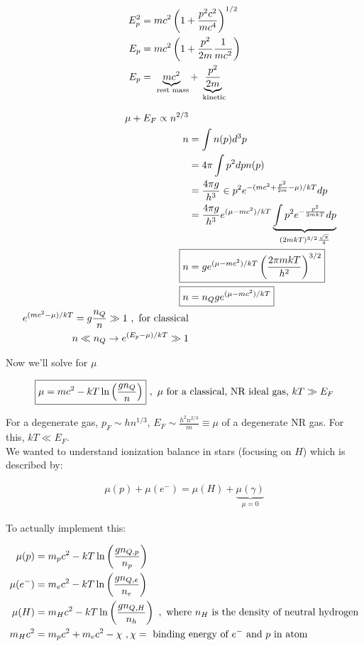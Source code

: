 \begin{align}
E_p^2 &= mc^2\left( 1 + \frac{p^2c^2}{mc^4} \right)^{1/2}\\
E_p &= mc^2 \left( 1 + \frac{p^2}{2m} \frac{1}{mc^2} \right)\\
E_p &= \underbrace{mc^2}_{\text{ rest mass}} + \underbrace{\frac{p^2}{2m}}_{\text{ kinetic}}
\end{align}

\begin{align}
\mu + E_F \pt n^{2/3}\\
n &= \int n(p) d^3p\\
&= 4 \pi \int p^2 dp n(p)\\
&= \frac{4 \pi g}{h^3}  \in p^2 e^{-(mc^2 + \frac{p^2}{2m} - \mu)/kT} dp\\
&= \frac{4 \pi g}{h^3} e^{(\mu -mc^2)/kT} \underbrace{\int  p^2 e^{-\frac{p^2}{2mkT}} dp}_{(2mkT)^{3/2} \frac{\sqrt{\pi}}{4}}\\
\Aboxed{n &= g e^{(\mu - mc^2)/kT} \lp \frac{2 \pi mkT}{h^2} \rp^{3/2}}\\
\Aboxed{n &= n_Q g e^{(\mu - mc^2)/kT}}\\
e^{(mc^2 - \mu)/kT} = g\frac{n_Q}{n} \gg 1 ~, \text{ for classical}\\
n \ll n_Q \ra e^{(E_p - \mu)/kT} \gg 1
\end{align}

Now we'll solve for $\mu$

\begin{align}
\boxed{\mu = mc^2 - kT \ln \left( \frac{gn_Q}{n} \right)} ~,\text{ $\mu$ for a classical, NR ideal gas, }kT \gg E_F
\end{align}

For a degenerate gas, $p_F \sim hn^{1/3}$, $E_F \sim \frac{h^2 n^{2/3}}{m} \equiv \mu$ of a degenerate NR gas. For this, $kT \ll E_F$. \\

We wanted to understand ionization balance in stars (focusing on $H$) which is described by:

\begin{align}
\mu(p) + \mu(e^-) = \mu(H) + \underbrace{\mu(\gamma)}_{\mu = 0}
\end{align}

To actually implement this:

\begin{align}
\mu(p) &= m_pc^2 - kT\ln \left( \frac{gn_{Q,p}}{n_p} \right)\\
\mu(e^-) &= m_ec^2 - kT\ln \left( \frac{gn_{Q,e}}{n_e} \right)\\
\mu(H) &= m_Hc^2 - kT\ln \left( \frac{gn_{Q,H}}{n_h} \right)~,\text{ where $n_H$ is the density of neutral hydrogen}\\
m_Hc^2 &= m_pc^2 + m_ec^2 - \chi~,\chi = \text{ binding energy of $e^-$ and $p$ in atom}
\end{align}

